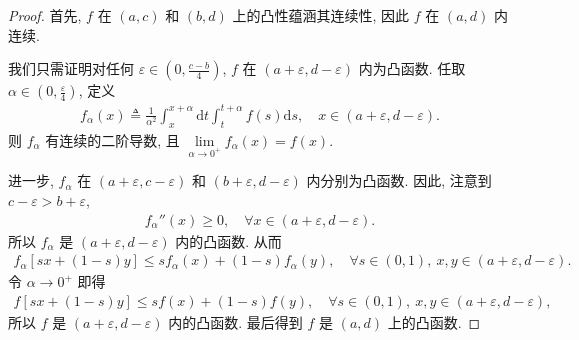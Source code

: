 \documentclass[../../main.tex]{subfiles}%
\begin{document}
\begin{proof}
首先, $f$ 在 $(a,c)$ 和 $(b,d)$ 上的凸性蕴涵其连续性, 因此 $f$ 在 $(a,d)$ 内连续.

我们只需证明对任何 $\varepsilon \in \left(0,\frac{c-b}{4}\right)$, $f$ 在 $(a+\varepsilon,d-\varepsilon)$ 内为凸函数. 任取 $\alpha \in \left(0,\frac{\varepsilon}{4}\right)$, 定义
\begin{align*}
f_\alpha(x) \triangleq \frac{1}{\alpha^2} \int_{x}^{x+\alpha} \mathrm{d}t \int_{t}^{t+\alpha} f(s) \mathrm{d}s, \quad x \in (a+\varepsilon,d-\varepsilon).
\end{align*}
则 $f_\alpha$ 有连续的二阶导数, 且 $\lim\limits_{\alpha \to 0^+} f_\alpha(x) = f(x)$.

进一步, $f_\alpha$ 在 $(a+\varepsilon,c-\varepsilon)$ 和 $(b+\varepsilon,d-\varepsilon)$ 内分别为凸函数. 因此, 注意到 $c-\varepsilon > b+\varepsilon$,
\begin{align*}
f_\alpha''(x) \geqslant 0, \quad \forall x \in (a+\varepsilon,d-\varepsilon).
\end{align*}
所以 $f_\alpha$ 是 $(a+\varepsilon,d-\varepsilon)$ 内的凸函数. 从而
\begin{align*}
f_\alpha[sx + (1-s)y] \leqslant s f_\alpha(x) + (1-s) f_\alpha(y), \quad \forall s \in (0,1),\ x,y \in (a+\varepsilon,d-\varepsilon).
\end{align*}
令 $\alpha \to 0^+$ 即得
\begin{align*}
f[sx + (1-s)y] \leqslant s f(x) + (1-s) f(y), \quad \forall s \in (0,1),\ x,y \in (a+\varepsilon,d-\varepsilon),
\end{align*}
所以 $f$ 是 $(a+\varepsilon,d-\varepsilon)$ 内的凸函数. 最后得到 $f$ 是 $(a,d)$ 上的凸函数.
\end{proof}
\end{document}
